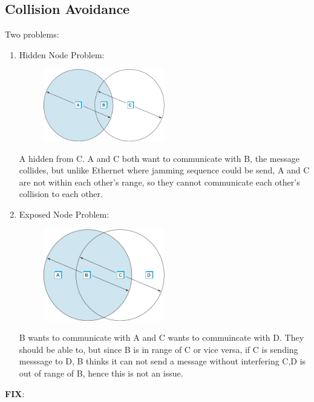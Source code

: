 \documentclass[12pt]{book}
\begin{document}
\subsection{Collision Avoidance}
Two problems:
\begin{enumerate}
    \item Hidden Node Problem:
    \begin{figure}[H]
        \centering
        \includegraphics[width = 0.5\textwidth]{Pictures/hidden node.png}
        \label{fig:my_label}
    \end{figure}
    A hidden from C. A and C both want to communicate with B, the message collides, but unlike Ethernet where jamming sequence could be send, A and C are not within each other's range, so they cannot communicate each other's collision to each other.
    \item Exposed Node Problem:
    \begin{figure}[H]
        \centering
        \includegraphics[width = 0.5\textwidth]{Pictures/exposed node.png}
        \label{fig:my_label}
    \end{figure}
    B wants to communicate with A and C wants to commuincate with D. They should be able to, but since B is in range of C or vice versa, if C is sending messsage to D, B thinks it can not send a message without interfering C,D is out of range of B, hence this is not an issue.
\end{enumerate}
\textbf{FIX}: 
\end{document}
